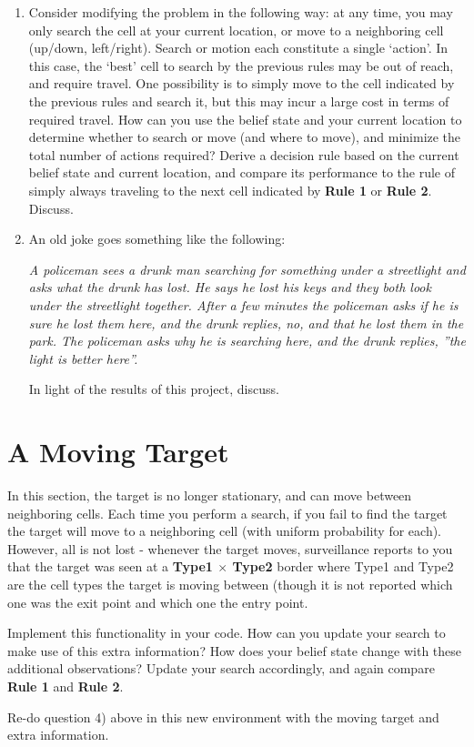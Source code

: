 \documentclass[letter]{article}
\begin{document}
\begin{enumerate}
	\item {Consider modifying the problem in the following way: at any time, you may only search the cell at your
		current location, or move to a neighboring cell (up/down, left/right). Search or motion each constitute a single
		`action'. In this case, the `best' cell to search by the previous rules may be out of reach, and require travel.
		One possibility is to simply move to the cell indicated by the previous rules and search it, but this may incur a
		large cost in terms of required travel. How can you use the belief state and your current location to determine
		whether to search or move (and where to move), and minimize the total number of actions required? Derive a
		decision rule based on the current belief state and current location, and compare its performance to the rule
		of simply always traveling to the next cell indicated by \textbf{Rule 1} or \textbf{Rule 2}. Discuss.}
	
	\item {An old joke goes something like the following: 
		\begin{center}
			\textit{A policeman sees a drunk man searching for something under a streetlight and asks what the drunk has lost.
				He says he lost his keys and they both look under the streetlight together. After a few minutes the policeman
				asks if he is sure he lost them here, and the drunk replies, no, and that he lost them in the park. The
				policeman asks why he is searching here, and the drunk replies, ”the light is better here”.}
		\end{center}
		\par{In light of the results of this project, discuss.}
		}
\end{enumerate}

\section{A Moving Target}
\label{sec:A Moving Target}
\par{In this section, the target is no longer stationary, and can move between neighboring cells. Each time you perform
	a search, if you fail to find the target the target will move to a neighboring cell (with uniform probability for each).
	However, all is not lost - whenever the target moves, surveillance reports to you that the target was seen at a \textbf{Type1
	$ \times $ Type2} border where Type1 and Type2 are the cell types the target is moving between (though it is not reported
	which one was the exit point and which one the entry point. }
	
\par{Implement this functionality in your code. How can you update your search to make use of this extra information?
	How does your belief state change with these additional observations? Update your search accordingly, and again
	compare \textbf{Rule 1} and \textbf{Rule 2}.}

\par{Re-do question 4) above in this new environment with the moving target and extra information.}
\end{document}

